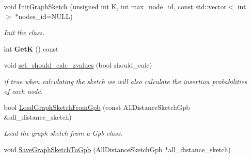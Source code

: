 \begin{DoxyCompactItemize}
\item 
void \hyperlink{classall__distance__sketch_1_1GraphSketch_a6d41436a73844dd633b6184a89ce83ff}{Init\+Graph\+Sketch} (unsigned int K, int max\+\_\+node\+\_\+id, const std\+::vector$<$ int $>$ $\ast$nodes\+\_\+id=N\+U\+L\+L)
\begin{DoxyCompactList}\small\item\em Init the class. \end{DoxyCompactList}\item 
\hypertarget{classall__distance__sketch_1_1GraphSketch_a32fef9d13b965dd7b5a776596d888a41}{}int {\bfseries Get\+K} () const \label{classall__distance__sketch_1_1GraphSketch_a32fef9d13b965dd7b5a776596d888a41}

\item 
\hypertarget{classall__distance__sketch_1_1GraphSketch_a8d5aaa1b4e94e0361ea0b1afdbfcf8bc}{}void \hyperlink{classall__distance__sketch_1_1GraphSketch_a8d5aaa1b4e94e0361ea0b1afdbfcf8bc}{set\+\_\+should\+\_\+calc\+\_\+zvalues} (bool should\+\_\+calc)\label{classall__distance__sketch_1_1GraphSketch_a8d5aaa1b4e94e0361ea0b1afdbfcf8bc}

\begin{DoxyCompactList}\small\item\em if true when calculating the sketch we will also calculate the insertion probabilities of each node. \end{DoxyCompactList}\item 
\hypertarget{classall__distance__sketch_1_1GraphSketch_a1ec9f5d7a83387252d899833aef82855}{}bool \hyperlink{classall__distance__sketch_1_1GraphSketch_a1ec9f5d7a83387252d899833aef82855}{Load\+Graph\+Sketch\+From\+Gpb} (const All\+Distance\+Sketch\+Gpb \&all\+\_\+distance\+\_\+sketch)\label{classall__distance__sketch_1_1GraphSketch_a1ec9f5d7a83387252d899833aef82855}

\begin{DoxyCompactList}\small\item\em Load the graph sketch from a Gpb class. \end{DoxyCompactList}\item 
\hypertarget{classall__distance__sketch_1_1GraphSketch_a9243b99edf30ba1f1c33d6e45fb1e152}{}void \hyperlink{classall__distance__sketch_1_1GraphSketch_a9243b99edf30ba1f1c33d6e45fb1e152}{Save\+Graph\+Sketch\+To\+Gpb} (All\+Distance\+Sketch\+Gpb $\ast$all\+\_\+distance\+\_\+sketch)\label{classall__distance__sketch_1_1GraphSketch_a9243b99edf30ba1f1c33d6e45fb1e152}


\end{DoxyCompactItemize}
